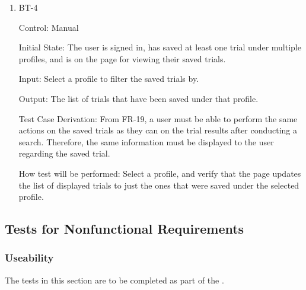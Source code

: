 \documentclass[12pt, titlepage]{article}
\begin{document}
\begin{enumerate}
\item{BT-4\\}

Control: Manual
					
Initial State: The user is signed in, has saved at least one trial under multiple profiles, and is on the page for viewing their saved trials.
					
Input: Select a profile to filter the saved trials by.
					
Output: The list of trials that have been saved under that profile.

Test Case Derivation: From FR-19, a user must be able to perform the same actions on the saved trials as they can on the trial results after 
conducting a search. Therefore, the same information must be displayed to the user regarding the saved trial.

How test will be performed: Select a profile, and verify that the page updates the list of displayed trials to just the ones that were saved
under the selected profile.


\end{enumerate}


\subsection{Tests for Nonfunctional Requirements}

\subsubsection{Useability}
\label{sec:useabilityNFRtests}

The tests in this section are to be completed as part of the .
\end{document}
